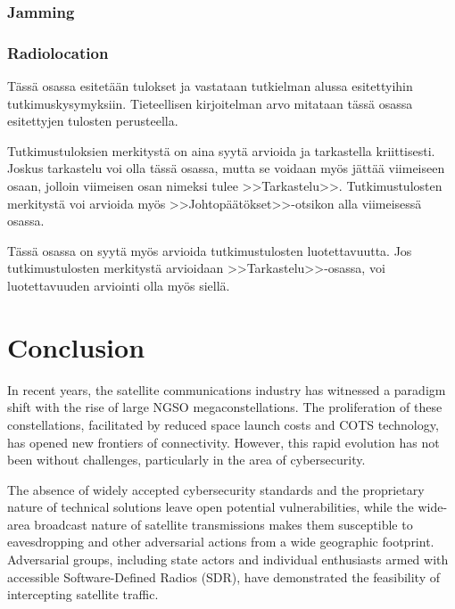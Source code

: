 \documentclass[english, 12pt, a4paper, elec, utf8, a-1b, online]{aaltothesis}
\begin{document}
\subsubsection{Jamming}
\subsubsection{Radiolocation}


T\"ass\"a osassa esitet\"a\"an tulokset ja vastataan tutkielman alussa
esitettyihin tutkimuskysymyksiin.
Tieteellisen kirjoitelman
arvo mitataan t\"ass\"a osassa esitettyjen tulosten perusteella.

Tutkimustuloksien merkityst\"a on aina syyt\"a arvioida ja tarkastella
kriittisesti.  Joskus tarkastelu voi olla t\"ass\"a osassa, mutta se
voidaan my\"os j\"att\"a\"a viimeiseen osaan, jolloin viimeisen osan nimeksi
tulee >>Tarkastelu>>. Tutkimustulosten merkityst\"a voi arvioida my\"os
>>Johtop\"a\"at\"okset>>-otsikon alla viimeisess\"a osassa.

T\"ass\"a osassa on syyt\"a my\"os arvioida tutkimustulosten luotettavuutta.
Jos tutkimustulosten merkityst\"a arvioidaan >>Tarkastelu>>-osassa,
voi luotettavuuden arviointi olla my\"os siell\"a.

\clearpage

\section{Conclusion}

In recent years, the satellite communications industry has witnessed a paradigm shift with the rise of large NGSO megaconstellations.
The proliferation of these constellations, facilitated by reduced space launch costs and COTS technology, has opened new frontiers of connectivity.
However, this rapid evolution has not been without challenges, particularly in the area of cybersecurity.

The absence of widely accepted cybersecurity standards and the proprietary nature of technical solutions leave open potential vulnerabilities, while the wide-area broadcast nature of satellite transmissions makes them susceptible to eavesdropping and other adversarial actions from a wide geographic footprint.
Adversarial groups, including state actors and individual enthusiasts armed with accessible Software-Defined Radios (SDR), have demonstrated the feasibility of intercepting satellite traffic.
\end{document}

